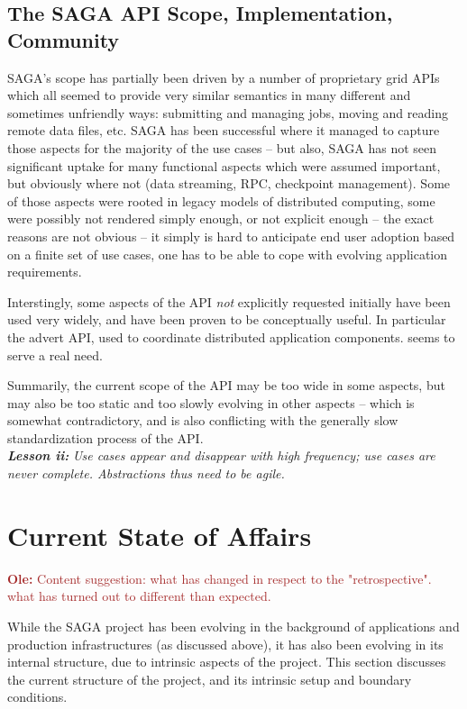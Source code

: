 \documentclass{article}
\newcommand{\I}[1]{\textit{#1}}
\newcommand{\B}[1]{\textbf{#1}}
\newcommand{\BI}[1]{\textbf{\textit{#1}}}
\newcommand{\ownote}[1]{{\textcolor{Brown}{   \B{Ole:     } #1 }}}
\newcommand{\ownote}[1]{}
\begin{document}
 \subsection{The SAGA API Scope, Implementation, Community}

  SAGA's scope has partially been driven by a number of proprietary grid APIs
  which all seemed to provide very similar semantics in many different and
  sometimes unfriendly ways: submitting and managing jobs, moving and reading
  remote data files, etc.  SAGA has been successful where it managed to capture
  those aspects for the majority of the use cases -- but also, SAGA has not seen
  significant uptake for many functional aspects which were assumed important,
  but obviously where not (data streaming, RPC, checkpoint management).  Some of
  those aspects were rooted in legacy models of distributed computing, some were
  possibly not rendered simply enough, or not explicit enough -- the exact
  reasons are not obvious -- it simply is hard to anticipate end user adoption
  based on a finite set of use cases, one has to be able to cope with evolving
  application requirements.

  Interstingly, some aspects of the API \I{not} explicitly requested initially
  have been used very widely, and have been proven to be conceptually useful.
  In particular the advert API, used to coordinate distributed application
  components. seems to serve a real need.

  Summarily, the current scope of the API may be too wide in some aspects, but
  may also be too static and too slowly evolving in other aspects -- which is
  somewhat contradictory, and is also conflicting with the generally slow
  standardization process of the API.\\
  \BI{Lesson ii:} \I{Use cases appear and disappear with high frequency; use
  cases are never complete.  Abstractions thus need to be agile.}



\section{Current State of Affairs}
\label{sec:state}

 \ownote{Content suggestion: what has changed in respect to the
 "retrospective". what has turned out to different than expected.}

While the SAGA project has been evolving in the background of
applications and production infrastructures (as discussed above), it
has also been evolving in its internal structure, due to intrinsic
aspects of the project.  This section discusses the current structure
of the project, and its intrinsic setup and boundary conditions.
\end{document}
